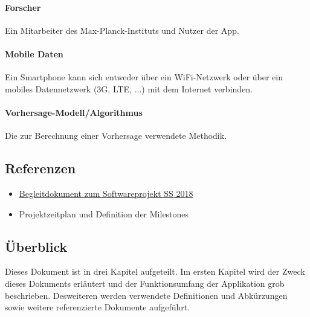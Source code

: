 \documentclass[12pt]{article} %
\begin{document}
 \paragraph{Forscher} Ein Mitarbeiter des Max-Planck-Instituts und Nutzer der App.
 \paragraph{Mobile Daten} Ein Smartphone kann sich entweder über ein WiFi-Netzwerk oder über ein mobiles Datennetzwerk (3G, LTE, ...) mit dem Internet verbinden. 
\paragraph{Vorhersage-Modell/Algorithmus} Die zur Berechnung einer Vorhersage verwendete Methodik. 

\subsection{Referenzen}

\begin{itemize} 
 	 \item  \href{https://docs.google.com/document/d/1Yc2f18JFaHyhrgM2h2WiATQ0zVmZnsc9W1ImhwWJF-g/edit?usp=sharing}{Begleitdokument zum Softwareprojekt SS 2018}
 	 \item Projektzeitplan und Definition der Milestones
\end{itemize} 



\subsection{Überblick}

Dieses Dokument ist in drei Kapitel aufgeteilt. Im ersten Kapitel wird der Zweck dieses Dokuments erläutert und der Funktionsumfang der Applikation grob beschrieben. Desweiteren werden verwendete Definitionen und Abkürzungen sowie weitere referenzierte Dokumente aufgeführt.

\end{document}
